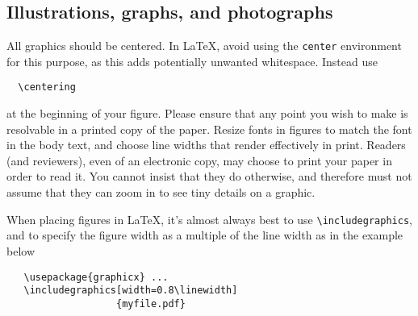 \documentclass[10pt,twocolumn,letterpaper]{article}
\begin{document}
\subsection{Illustrations, graphs, and photographs}

All graphics should be centered.
In \LaTeX, avoid using the \texttt{center} environment for this purpose, as this adds potentially unwanted whitespace.
Instead use
{\small\begin{verbatim}
  \centering
\end{verbatim}}
at the beginning of your figure.
Please ensure that any point you wish to make is resolvable in a printed copy of the paper.
Resize fonts in figures to match the font in the body text, and choose line widths that render effectively in print.
Readers (and reviewers), even of an electronic copy, may choose to print your paper in order to read it.
You cannot insist that they do otherwise, and therefore must not assume that they can zoom in to see tiny details on a graphic.

When placing figures in \LaTeX, it's almost always best to use \verb+\includegraphics+, and to specify the figure width as a multiple of the line width as in the example below
{\small\begin{verbatim}
   \usepackage{graphicx} ...
   \includegraphics[width=0.8\linewidth]
                   {myfile.pdf}
\end{verbatim}
}




{\small


}
\end{document}
